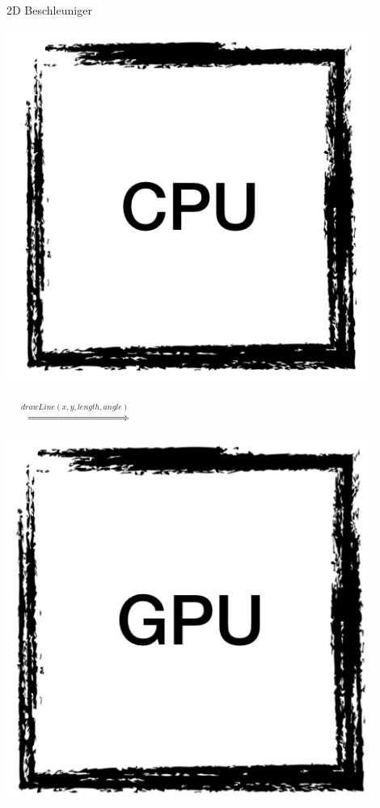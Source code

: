 \documentclass[10pt,aspectratio=169]{beamer}
\begin{document}
\begin{frame}{2D Beschleuniger}
\begin{minipage}[t]{0.32\textwidth}
\includegraphics[width=0.9\textwidth]{cpu.png}
\end{minipage}
\begin{minipage}[t]{0.32\textwidth}
\vspace{-2cm}
$\quad \overset{drawLine(x, y, length, angle)}{\Rightarrow}$
\end{minipage}
\begin{minipage}[t]{0.32\textwidth}
\includegraphics[width=0.9\textwidth]{gpu.png}
\end{minipage}
\end{frame}
\end{document}
